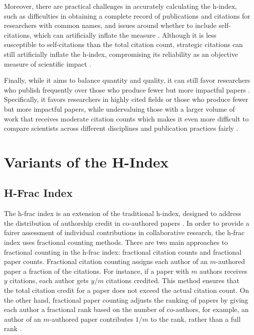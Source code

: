 Moreover, there are practical challenges in accurately calculating the h-index,
such as difficulties in obtaining a complete record of publications and
citations for researchers with common names, and issues around whether to
include self-citations, which can artificially inflate the measure
\cite{costas2007h,norris2010h,bartneck2011detecting}. Although it is less
susceptible to self-citations than the total citation count, strategic
citations can still artificially inflate the h-index, compromising its
reliability as an objective measure of scientific impact
\cite{hirsch2005index,bornmann2007what,costas2007h,waltman2012inconsistency,norris2010h,egghe2010hirsch,hirsch2014meaning,bartneck2011detecting}.

Finally, while it aims to balance quantity and quality, it can still favor
researchers who publish frequently over those who produce fewer but more
impactful papers
\cite{hirsch2005index,costas2007h,waltman2012inconsistency,norris2010h,egghe2010hirsch,hirsch2014meaning}.
Specifically, it favors researchers in highly cited fields or those who produce
fewer but more impactful papers, while undervaluing those with a larger volume
of work that receives moderate citation counts which makes it even more
difficult to compare scientists across different disciplines and publication
practices fairly
\cite{hirsch2005index,costas2007h,waltman2012inconsistency,egghe2010hirsch}.

\section{Variants of the H-Index}
\subsection{H-Frac Index}
The h-frac index is an extension of the traditional h-index, designed to
address the distribution of authorship credit in co-authored papers
\cite{egghe2008mathematical}. In order to provide a fairer assessment of
individual contributions in collaborative research, the h-frac index uses
fractional counting methods. There are two main approaches to fractional
counting in the h-frac index: fractional citation counts and fractional paper
counts. Fractional citation counting assigns each author of an $m$-authored
paper a fraction of the citations. For instance, if a paper with $m$ authors
receives $y$ citations, each author gets $y/m$ citations credited. This method
ensures that the total citation credit for a paper does not exceed the actual
citation count. On the other hand, fractional paper counting adjusts the
ranking of papers by giving each author a fractional rank based on the number
of co-authors, for example, an author of an $m$-authored paper contributes
$1/m$ to the rank, rather than a full rank
\cite{egghe2008mathematical,bihari2018}.

